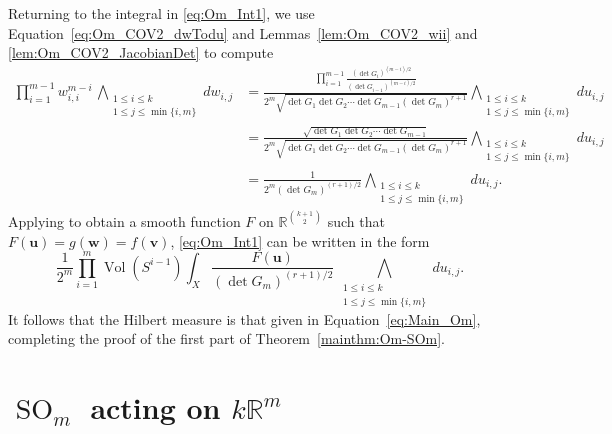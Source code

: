 \documentclass[twoside]{amsart}
\theoremstyle{definition}
\theoremstyle{remark}
\numberwithin{equation}{section}
\newcommand{\R}{\mathbb{R}}
\newcommand{\SO}{\operatorname{SO}}
\newcommand{\Vol}{\operatorname{Vol}}
\begin{document}
Returning to the integral in \eqref{eq:Om_Int1}, we use Equation~\eqref{eq:Om_COV2_dwTodu} and Lemmas~\ref{lem:Om_COV2_wii} and \ref{lem:Om_COV2_JacobianDet}
to compute
\begin{align*}
    \prod\limits_{i=1}^{m-1} w_{i,i}^{m-i} \,
        \bigwedge\limits_{\substack{1\leq i\leq k \\ 1\leq j \leq {\min\{i,m\}} }}  dw_{i,j}
    &=
    \frac{\prod\limits_{i=1}^{m-1} \frac{(\det G_i)^{(m - i)/2}}{(\det G_{i-1})^{(m - i)/2} } }
        { 2^m \sqrt{\det G_1\det G_2\cdots\det G_{m-1}(\det G_m)^{r+1} } }
        \bigwedge\limits_{\substack{1\leq i\leq k \\ 1\leq j \leq {\min\{i,m\}} }}  du_{i,j}
    \\&=
    \frac{\sqrt{\det G_1\det G_2\cdots\det G_{m-1} } }
        { 2^m \sqrt{\det G_1\det G_2\cdots\det G_{m-1}(\det G_m)^{r+1} } }
        \bigwedge\limits_{\substack{1\leq i\leq k \\ 1\leq j \leq {\min\{i,m\}} }}  du_{i,j}
    \\&=
    \frac{1}
        { 2^m (\det G_m)^{(r+1)/2} }
        \bigwedge\limits_{\substack{1\leq i\leq k \\ 1\leq j \leq {\min\{i,m\}} }}  du_{i,j}.
\end{align*}
Applying \cite[Thrm.~1]{GWSdiff} to obtain a smooth function $F$ on $\R^{{k+1\choose 2}}$ such that $F(\mathbf{u}) = g(\mathbf{w}) = f(\mathbf{v})$,
\eqref{eq:Om_Int1} can be written in the form
\begin{equation}
\label{eq:Om_Int2}
    \frac{1}{2^m}\prod\limits_{i=1}^m \Vol(S^{i-1}) \int_{X}  \frac{ F(\mathbf{u}) }{ (\det G_m)^{(r+1)/2}}
         \, \bigwedge\limits_{\substack{1\leq i\leq k \\ 1\leq j \leq {\min\{i,m\}} }}  du_{i,j}.
\end{equation}
It follows that the Hilbert measure is that given in Equation~\eqref{eq:Main_Om}, completing the proof of the first part of Theorem~\ref{mainthm:Om-SOm}.


\section{$\SO_m$ acting on $k\R^m$}
\label{sec:SOm_kRm}
\end{document}
